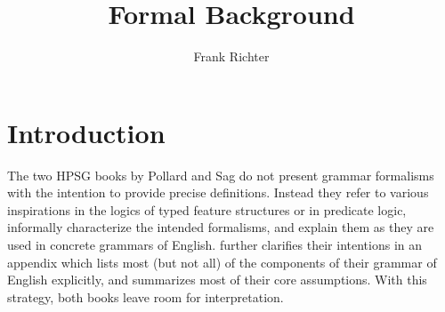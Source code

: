 \documentclass[output=paper
                ,modfonts
                ,nonflat
	        ,collection
	        ,collectionchapter
	        ,collectiontoclongg
 	        ,biblatex
                ,babelshorthands
                ,newtxmath
                ,draftmode
                ,colorlinks, citecolor=brown
]{./langsci/langscibook}
\author{%
 Frank Richter\affiliation{Goethe Universität Frankfurt}%
}
\title{Formal Background}
\begin{document}
\maketitle
\label{chap-formal-background}

\maketitle

{

\section{Introduction}
\label{sec-introduction}

The two HPSG books by Pollard and Sag
\citep{PollardSag1987,PollardSag1994} do not present grammar formalisms
with the intention to provide precise definitions.
Instead they refer to various inspirations in the
logics of typed feature structures or in predicate logic, informally
characterize the intended formalisms, and explain them as they are
used in concrete grammars of English. \citet{PollardSag1994} further clarifies
their intentions in an appendix which lists most (but not all) of the components
of their grammar of English explicitly, and summarizes most of their core
assumptions. With this strategy, both books leave room for
interpretation.

}
\end{document}
